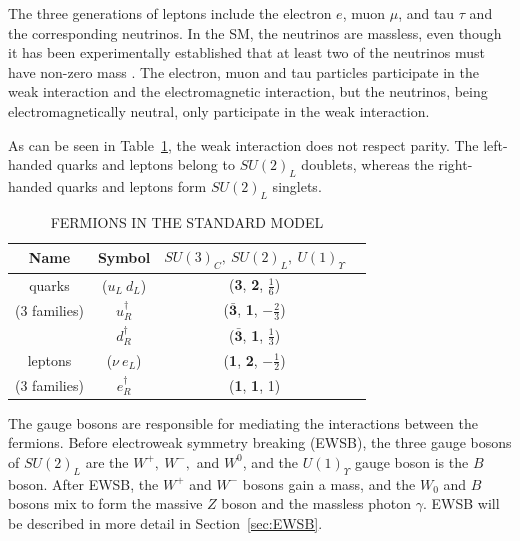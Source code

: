 The three generations of leptons include the electron $e$, muon $\mu$, and tau $\tau$ and the corresponding neutrinos. In the SM, the neutrinos are massless, even though it has been experimentally established that at least two of the neutrinos must have non-zero mass 
\cite{PhysRevLett.81.1562,PhysRevLett.87.071301,PhysRevLett.89.011301}. 
The electron, muon and tau particles participate in the weak interaction and the electromagnetic interaction, but the neutrinos, being electromagnetically neutral, only participate in the weak interaction. 

As can be seen in Table~\ref{tab:fermions}, the weak interaction does not respect parity. The left-handed quarks and leptons belong to $SU(2)_L$ doublets, whereas the right-handed quarks and leptons form $SU(2)_L$ singlets.

\begin{table}[ht]
    \caption{FERMIONS IN THE STANDARD MODEL}
    \centering
    \begin{tabular}{|c|c|c|c|}
    \hline
    \hline
    Name  & Symbol & $SU(3)_C,~SU(2)_L,~U(1)_\Upsilon $\\
  	  \hline
           \hline    
quarks        & ($u_L~d_L$)     & (\textbf{3}, \textbf{2}, $\frac{1}{6}$) \\
(3 families) & $u_R^\dagger$ & ($\bar{\textbf{3}}$, \textbf{1}, $-\frac{2}{3}$) \\
                   & $d_R^\dagger$ & ($\bar{\textbf{3}}$, \textbf{1}, $\frac{1}{3}$) \\
                   \hline
leptons       & ($\nu~e_L$)      &  (\textbf{1}, \textbf{2}, $-\frac{1}{2}$) \\
(3 families) & $e_R^\dagger$ &  (\textbf{1}, \textbf{1}, 1) \\
           \hline
           \hline
    \end{tabular}
    \label{tab:fermions}
\end{table}

The gauge bosons are responsible for mediating the interactions between the fermions. Before electroweak symmetry breaking (EWSB), the three gauge bosons of $SU(2)_L$ are the $W^+,~W^-,$ and $W^0$, and the $U(1)_\Upsilon$ gauge boson is the $B$ boson. After EWSB, the $W^+$ and $W^-$ bosons gain a mass, and the $W_0$ and $B$ bosons mix to form the massive $Z$ boson and the massless photon $\gamma$. EWSB will be described in more detail in Section~\ref{sec:EWSB}.

